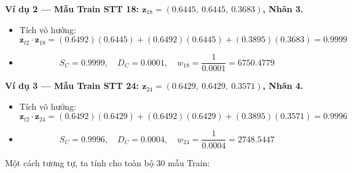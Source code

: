 \documentclass[12pt,a4paper]{article}
\begin{document}
\textbf{Ví dụ 2 — Mẫu Train STT 18: $\mathbf{z}_{18} = (0.6445,\ 0.6445,\ 0.3683)$, Nhãn 3.}
\begin{itemize}
    \item Tích vô hướng:
    \[
        \mathbf{z}_{t2} \cdot \mathbf{z}_{18}
        = (0.6492)(0.6445) + (0.6492)(0.6445) + (0.3895)(0.3683) = 0.9999
    \]
    \item
    \[
        S_C = 0.9999, \quad D_C = 0.0001, \quad
        w_{18} = \frac{1}{0.0001} = 6750.4779
    \]
\end{itemize}
 
\textbf{Ví dụ 3 — Mẫu Train STT 24: $\mathbf{z}_{24} = (0.6429,\ 0.6429,\ 0.3571)$, Nhãn 4.}
\begin{itemize}
    \item Tích vô hướng:
    \[
        \mathbf{z}_{t2} \cdot \mathbf{z}_{24}
        = (0.6492)(0.6429) + (0.6492)(0.6429) + (0.3895)(0.3571) = 0.9996
    \]
    \item
    \[
        S_C = 0.9996, \quad D_C = 0.0004, \quad
        w_{24} = \frac{1}{0.0004} = 2748.5447
    \]
\end{itemize}
 
Một cách tương tự, ta tính cho toàn bộ 30 mẫu Train:
 
\end{document}
